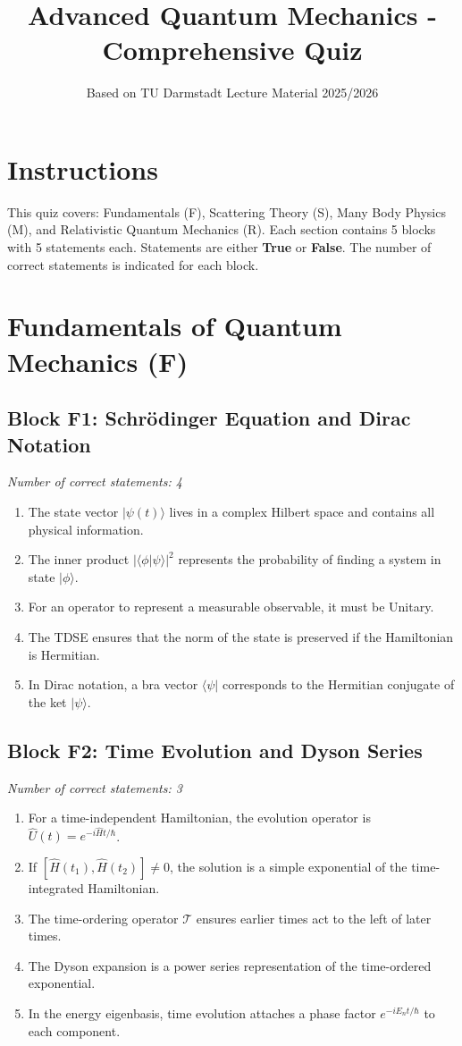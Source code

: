 \documentclass[a4paper,12pt]{article}
\title{Advanced Quantum Mechanics - Comprehensive Quiz}
\author{Based on TU Darmstadt Lecture Material 2025/2026}
\date{}
\begin{document}
\maketitle

\section*{Instructions}
This quiz covers: Fundamentals (F), Scattering Theory (S), Many Body Physics (M), and Relativistic Quantum Mechanics (R). Each section contains 5 blocks with 5 statements each. Statements are either \textbf{True} or \textbf{False}. The number of correct statements is indicated for each block.

\newpage

\section{Fundamentals of Quantum Mechanics (F)}

\subsection*{Block F1: Schrödinger Equation and Dirac Notation}
\textit{Number of correct statements: 4}
\begin{enumerate}[label=\roman*.]
    \item The state vector $|\psi(t)\rangle$ lives in a complex Hilbert space and contains all physical information.
    \item The inner product $|\langle\phi|\psi\rangle|^2$ represents the probability of finding a system in state $|\phi\rangle$.
    \item For an operator to represent a measurable observable, it must be Unitary.
    \item The TDSE ensures that the norm of the state is preserved if the Hamiltonian is Hermitian.
    \item In Dirac notation, a bra vector $\langle\psi|$ corresponds to the Hermitian conjugate of the ket $|\psi\rangle$.
\end{enumerate}

\subsection*{Block F2: Time Evolution and Dyson Series}
\textit{Number of correct statements: 3}
\begin{enumerate}[label=\roman*.]
    \item For a time-independent Hamiltonian, the evolution operator is $\hat{U}(t) = e^{-i\hat{H}t/\hbar}$.
    \item If $[\hat{H}(t_1), \hat{H}(t_2)] \neq 0$, the solution is a simple exponential of the time-integrated Hamiltonian.
    \item The time-ordering operator $\mathcal{T}$ ensures earlier times act to the left of later times.
    \item The Dyson expansion is a power series representation of the time-ordered exponential.
    \item In the energy eigenbasis, time evolution attaches a phase factor $e^{-iE_n t/\hbar}$ to each component.
\end{enumerate}
\end{document}
